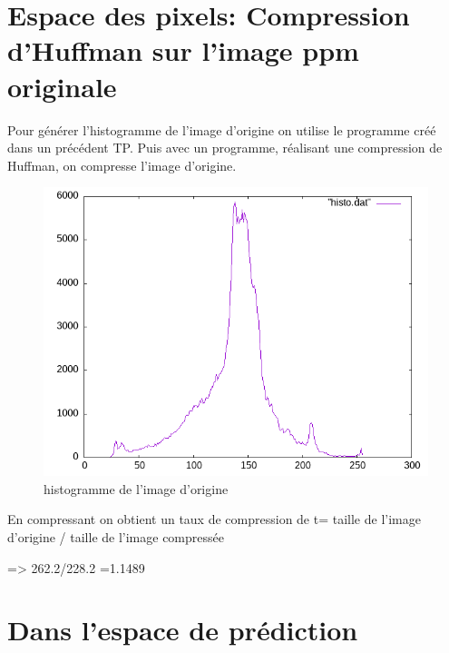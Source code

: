 \documentclass{article}
\begin{document}
\section{Espace des pixels: Compression d'Huffman sur l'image ppm originale}
Pour générer l'histogramme de l'image d'origine on utilise le programme créé dans un précédent TP.
Puis avec un programme, réalisant une compression de Huffman, on compresse l'image d'origine.
\begin{figure}[h]
\centerline{\includegraphics[scale=0.5]{./rendus/histo.png} }
\caption{histogramme de l'image d'origine}
\end{figure}
En compressant on obtient un taux de compression de t= taille de l'image d'origine / taille de l'image compressée

=> 262.2/228.2 =1.1489

\newpage
\section{Dans l'espace de prédiction}
\end{document}

